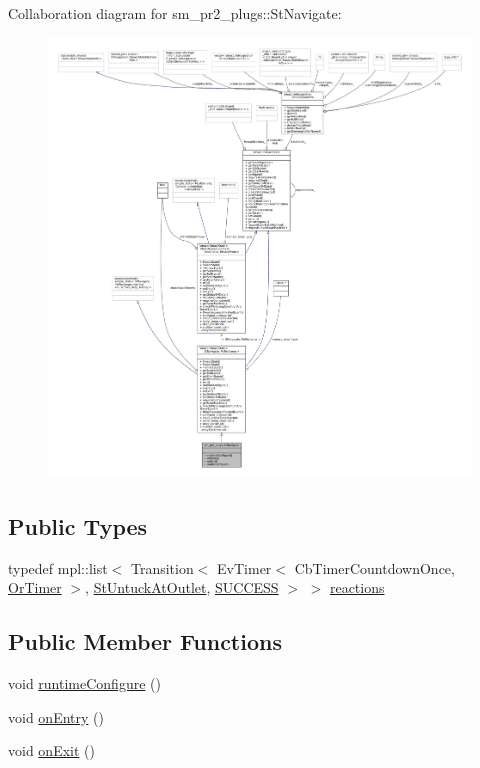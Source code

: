 Collaboration diagram for sm\+\_\+pr2\+\_\+plugs\+:\+:St\+Navigate\+:
\nopagebreak
\begin{figure}[H]
\begin{center}
\leavevmode
\includegraphics[width=350pt]{structsm__pr2__plugs_1_1StNavigate__coll__graph}
\end{center}
\end{figure}
\subsection*{Public Types}
\begin{DoxyCompactItemize}
\item 
typedef mpl\+::list$<$ Transition$<$ Ev\+Timer$<$ Cb\+Timer\+Countdown\+Once, \hyperlink{classsm__pr2__plugs_1_1OrTimer}{Or\+Timer} $>$, \hyperlink{structsm__pr2__plugs_1_1StUntuckAtOutlet}{St\+Untuck\+At\+Outlet}, \hyperlink{classSUCCESS}{S\+U\+C\+C\+E\+SS} $>$ $>$ \hyperlink{structsm__pr2__plugs_1_1StNavigate_a11299afba109067d019e8526f10f2286}{reactions}
\end{DoxyCompactItemize}
\subsection*{Public Member Functions}
\begin{DoxyCompactItemize}
\item 
void \hyperlink{structsm__pr2__plugs_1_1StNavigate_ae7ab6b7fda6772eb50c512da21085cc0}{runtime\+Configure} ()
\item 
void \hyperlink{structsm__pr2__plugs_1_1StNavigate_a4b93030d30eeb790de5b8e762f4d2b59}{on\+Entry} ()
\item 
void \hyperlink{structsm__pr2__plugs_1_1StNavigate_a251d2196eabcbc95a5cc2a94fd44e3ab}{on\+Exit} ()
\end{DoxyCompactItemize}
